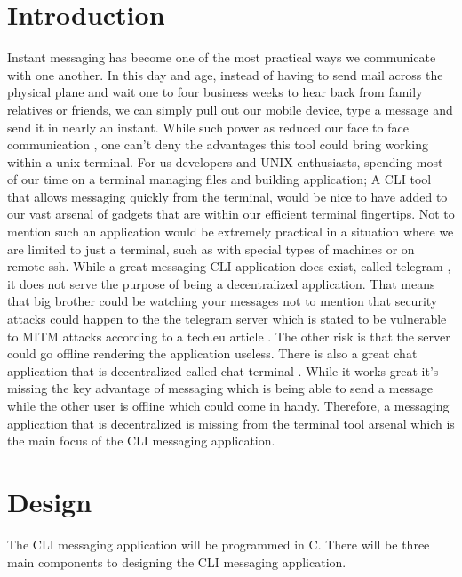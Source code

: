 \documentclass[twoside]{article}
\begin{document}
\begin{multicols}{2} %

\section{Introduction}

\lettrine[nindent=0em,lines=3]{I}{}nstant messaging has become one of the most practical ways we communicate with one another. In this day and age, instead of having to send mail across the physical plane and
wait one to four business weeks to hear back from family relatives or friends, we can simply pull out our mobile device, type a 
message and send it in nearly an instant. While such power as reduced our face to face communication \cite{hemmer}, one can't deny the
advantages this tool could bring working within a unix terminal. For us developers and
UNIX enthusiasts, spending most of our time on a terminal managing files and building application; A CLI tool that allows messaging quickly from the 
terminal, would be nice to have added to our vast arsenal of gadgets that are within 
our efficient terminal fingertips. Not to mention such an application would be extremely practical in a situation where we are limited 
to just a terminal, such as with special types of machines or on remote ssh. While a great messaging CLI application does exist, 
called telegram \cite{telegram}, it does not serve the purpose of being a decentralized application. That means that big brother 
could be watching your messages not to mention that security attacks could happen to the the telegram server which is stated to be 
vulnerable to MITM attacks according to a tech.eu article \cite{wauters}. The other risk is that the server could go offline 
rendering the application useless. There is also a great chat application that is decentralized called chat terminal \cite{lanchat}. 
While it works great it's missing the key advantage of messaging which is being able to send a message while the other user is 
offline which could come in handy. Therefore,
a messaging application that is decentralized is missing from the terminal tool arsenal which is the main focus of the CLI messaging 
application. 


\section{Design}

The CLI messaging application will be programmed in C. There will be three main components to designing the CLI messaging application.


\end{multicols}
\end{document}
